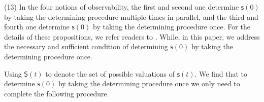 {\color{red} (13)} In the four notions of observability, the first and second one determine $\mathsf{s}(0)$ by taking the determining procedure multiple times in parallel, and the third and fourth one determine $\mathsf{s}(0)$ by taking the determining procedure once. For the details of these propositions, we refer readers to \cite{cheng2009controllability, Zhao2010Input, Cheng2011Identification,Fornasini2013Observability}. %
While, in this paper, we address the necessary and sufficient condition of determining $\mathsf{s}(0)$ by taking the determining procedure once. %


Using $\mathsf{S}(t)$ to denote the set of possible valuations of $\mathsf{s}(t)$. We find that to determine $\mathsf{s}(0)$ by taking the determining procedure once we only need to complete the following procedure. 

